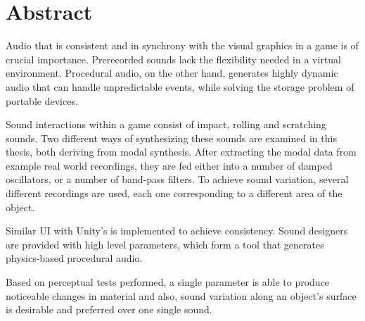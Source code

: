 \chapter*{Abstract}

Audio that is consistent and in synchrony with the visual graphics in a game is of crucial importance. Prerecorded sounds lack the flexibility needed in a virtual environment. Procedural audio, on the other hand, generates highly dynamic audio that can handle unpredictable events, while solving the storage problem of portable devices. 

Sound interactions within a game consist of impact, rolling and scratching sounds. Two different ways of synthesizing these sounds are examined in this thesis, both deriving from modal synthesis. After extracting the modal data from example real world recordings, they are fed either into a number of damped oscillators, or a number of band-pass filters. To achieve sound variation, several different recordings are used, each one corresponding to a different area of the object.

Similar UI with Unity\textsuperscript{\textregistered}'s is implemented to achieve consistency. Sound designers are provided with high level parameters, which form a tool that generates physics-based procedural audio.

Based on perceptual tests performed, a single parameter is able to produce noticeable changes in material and also, sound variation along an object's surface is desirable and preferred over one single sound.
